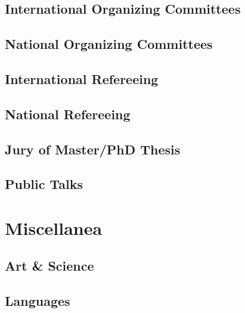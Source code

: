 \documentclass[a4paper,10pt]{article} %
\begin{document}
\subsection{International Organizing Committees}
\subsection{National Organizing Committees}
\subsection{International Refereeing}
\subsection{National Refereeing}
\subsection{Jury of Master/PhD Thesis}
\subsection{Public Talks}


\color{red}
\section{Miscellanea}
\color{black}
\subsection{Art \& Science}
\subsection{Languages}
\end{document}
